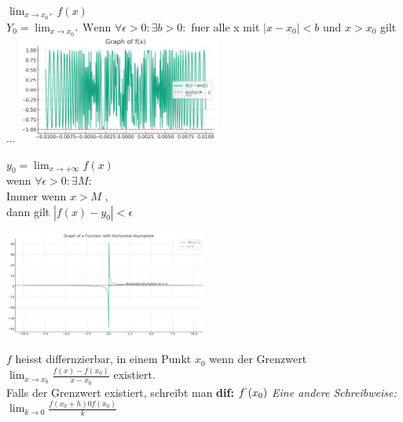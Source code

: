 \documentclass{article}
\theoremstyle{mytheoremstyle}
\theoremstyle{mytheoremstyle}
\theoremstyle{myproblemstyle}
\begin{document}
        \begin{definition} 
        \begin{multicols}{2}
            $ \lim_{{x \to x_0}^+}f(x)$ \\ 
        $Y_0 = \lim_{{x \to x_0}^+} \text{Wenn}$
        $\forall \epsilon  > 0 : \exists b > 0 : $ fuer alle x mit $\left| x-x_0 \right| < b$ und $x > x_0$ gilt $\ldots $    
       \columnbreak
       \includegraphics[width=0.5\textwidth]{3.6.2.png}
        \end{multicols}
    \end{definition}
        

        \begin{definition}[3.6.3 \\]
            \begin{multicols}{2}
                \( y_0 = \lim_{{x \to + \infty}} f(x) \) \\ wenn \( \forall \epsilon > 0: \exists M: \) \\ Immer wenn \( x > M \) , \\ dann gilt \( \left| f(x) - y_0 \right| < \epsilon \)

                \columnbreak

                \includegraphics[width=0.5\textwidth]{3.6.3.png}
            \end{multicols}
        
        \end{definition}

        \begin{definition}[3.6.4 \\ ]
        $f$ heisst differnzierbar, in einem Punkt $x_0$ wenn der Grenzwert \\ 
        $\lim_{x \to x_0} \frac{f(x)-f(x_0)}{x-x_0} $  existiert. \\ 
        \bigskip
        Falls der Grenzwert existiert, schreibt man \textbf{dif:} $f^`(x_0)$ 
        \textit{Eine andere Schreibweise:} $\lim_{k \to 0} \frac{f(x_0+h) 0 f(x_0)}{k} $ 
            
        \end{definition}
\end{document}

